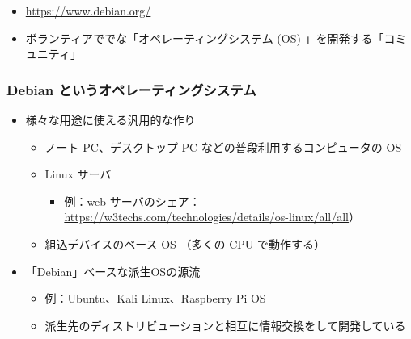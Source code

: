 \documentclass[mingoth,a4paper]{jsarticle}
\begin{document}



\begin{itemize}
  \item \url{https://www.debian.org/}
  \item ボランティアで{\color{red}{フリー/オープン}}で{\color{red}{ユニバーサル}}な「オペレーティングシステム (OS) 」を開発する「コミュニティ」
\end{itemize}



\subsubsection{Debian というオペレーティングシステム}

\begin{itemize}
\item 様々な用途に使える汎用的な作り
  \begin{itemize}
  \item ノート PC、デスクトップ PC などの普段利用するコンピュータの OS
  \item Linux サーバ
    \begin{itemize}
    \item 例：web サーバのシェア：\url{https://w3techs.com/technologies/details/os-linux/all/all}）
    \end{itemize}
  \item 組込デバイスのベース OS （多くの CPU で動作する）
  \end{itemize}
\item 「Debian」ベースな派生OSの源流
  \begin{itemize}
  \item 例：Ubuntu、Kali Linux、Raspberry Pi OS
  \item 派生先のディストリビューションと相互に情報交換をして開発している
  \end{itemize}
\end{itemize}
\end{document}
